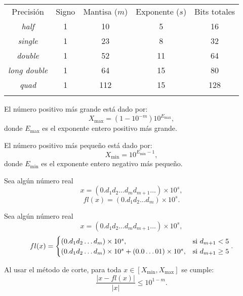 \documentclass[8pt,a4paper]{extarticle}
\begin{document}
\begin{multicols}{3}
\begin{center}
	\begin{tabular}{| c || c | c | c || c |}
		\hhline{-||---||-}
		Precisión          & Signo & Mantisa ($m$) & Exponente ($s$) & Bits totales \\
		\hhline{=::===::=}
		\emph{half}        & 1 & 10  & 5  & 16  \\
		\emph{single}      & 1 & 23	 & 8  & 32	\\
		\emph{double}      & 1 & 52	 & 11 & 64  \\
		\emph{long double} & 1 & 64	 & 15 & 80  \\
		\emph{quad}        & 1 & 112 & 15 & 128 \\
		\hhline{-||---||-}
	\end{tabular}
\end{center}

\begin{boxprop}[]
	El número positivo más grande está dado por:
	\[
		X_{\max} = \left( 1 - 10^{-m} \right) 10^{E_{\max}}
	,\]
	donde $E_{\max}$ es el exponente entero positivo más grande.
\end{boxprop}

\begin{boxprop}[]
	El número positivo más pequeño está dado por:
	\[
		X_{\min} = 10^{E_{\min} - 1}
	,\] 
	donde $E_{\min}$ es el exponente entero negativo más pequeño.
\end{boxprop}

\sectionbreak

\begin{boxdef}
	Sea algún número real \[x = (0.d_1 d_2 \ldots d_m d_{m + 1} \ldots) \times 10^s,\]
	\[
		fl(x)= (0.d_1 d_2 \ldots d_m) \times 10^s
	.\]
\end{boxdef}

\begin{boxdef}
	Sea algún número real
	\[x = (0.d_1 d_2 \ldots d_m d_{m + 1} \ldots) \times 10^s,\]
	\[
		fl(x) = \begin{cases}
			(0.d_1 d_2 \ldots d_m) \times 10^s, & \text{\normalfont si } d_{m+1} < 5 \\
			(0.d_1 d_2 \ldots d_m) \times 10^s + (0.0 \ldots 01)\times 10^s, & \text{\normalfont si } d_{m+1} \ge 5
		\end{cases}
	.\] 
\end{boxdef}

\begin{boxtheo}[]
	Al usar el método de corte, para toda $x \in \left[ X_{\min}, X_{\max} \right]$ se cumple:
	\[
		\frac{\left| x - fl(x) \right| }{ \left| x \right|  } \le 10^{1 - m}
	.\] 
\end{boxtheo}


\end{multicols}
\end{document}
